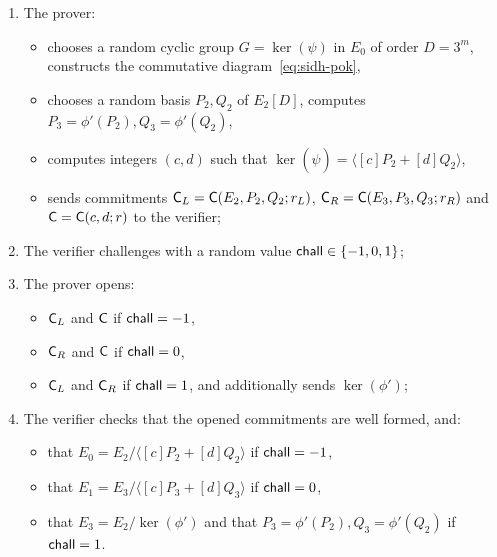 \begin{enumerate}
    \item The prover:
    \begin{itemize}
        \item chooses a random cyclic group $G = \ker(\psi)$ in $E_0$ of order $D=3^m$, constructs the commutative diagram~\eqref{eq:sidh-pok}, 
        \item chooses a random basis $P_2,Q_2$ of $E_2[D]$, computes $P_3 = \phi'(P_2), Q_3 = \phi'(Q_2)$,
        \item computes integers $(c,d)$ such that $\ker(\widehat\psi) = \langle [c]P_2 + [d]Q_2\rangle$,
        \item sends commitments $\mathsf{C}_L = \mathsf{C}(E_2,P_2,Q_2; r_L)$, $\mathsf{C}_R = \mathsf{C}(E_3,P_3,Q_3; r_R)$ and $\mathsf{C} = \mathsf{C}(c,d; r)$ to the verifier;
    \end{itemize}
    \item The verifier challenges with a random value $\mathsf{chall}\in\{-1,0,1\}$;
    \item The prover opens:
    \begin{itemize}
        \item $\mathsf{C}_L$ and $\mathsf{C}$ if $\mathsf{chall} = -1$,
        \item $\mathsf{C}_R$ and $\mathsf{C}$ if $\mathsf{chall} = 0$,
        \item $\mathsf{C}_L$ and $\mathsf{C}_R$ if $\mathsf{chall} = 1$, and additionally sends $\ker(\phi')$;
    \end{itemize}
    \item The verifier checks that the opened commitments are well formed, and:
    \begin{itemize}
        \item that $E_0 = E_2/\langle [c]P_2 + [d]Q_2\rangle$ if $\mathsf{chall} = -1$,
        \item that $E_1 = E_3/\langle [c]P_3 + [d]Q_3\rangle$ if $\mathsf{chall} = 0$,
        \item that $E_3 = E_2/\ker(\phi')$ and that $P_3 = \phi'(P_2), Q_3 = \phi'(Q_2)$ if $\mathsf{chall} = 1$.
    \end{itemize}
\end{enumerate}



